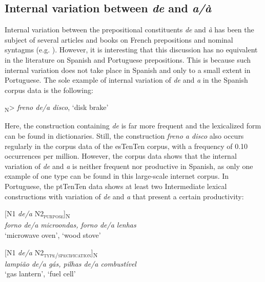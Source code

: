 \documentclass[output=paper]{langsci/langscibook}
\begin{document}
\subsection{Internal variation between \textit{de} and \textit{a/à}}

Internal variation between the prepositional constituents \textit{de} and \textit{à} has been the subject of several articles and books on French prepositions and nominal syntagms (e.g. \citealt{Anscombre:1990, Lang:1991, Bosredon:1991, Cadiot:1997}). However, it is interesting that this discussion has no equivalent in the literature on Spanish and Portuguese prepositions. This is because such internal variation does not take place in Spanish and only to a small extent in Portuguese. The sole example of internal variation of \textit{de} and \textit{a} in the Spanish corpus data is the following:

\ea{}\textsubscript{N}>		\textit{freno de/a disco},	`disk brake'\z

Here, the construction containing \textit{de} is far more frequent and the lexicalized form can be found in dictionaries. Still, the construction \textit{freno a disco} also occurs regularly in the corpus data of the esTenTen corpus, with a frequency of 0.10 occurrences per million. However, the corpus data shows that the internal variation of \textit{de} and \textit{a} is neither frequent nor productive in Spanish, as only one example of one type can be found in this large-scale internet corpus. In Portuguese, the ptTenTen data shows at least two Intermediate lexical constructions with variation of \textit{de} and \textit{a} that present a certain productivity:

\begin{exe}\ex\begin{minipage}[t]{0.4\textwidth}
[N1 \textit{de/a} N2\textsubscript{\scshape purpose}]\textsubscript{N}\\
\textit{forno de/a microondas,  forno de/a lenhas}\\
`microwave oven',         `wood stove'
\end{minipage}\hfill
\begin{minipage}[t]{0.45\textwidth}
[N1 \textit{de/a} N2\textsubscript{\scshape type/specification}]\textsubscript{N}\\
\textit{lampião de/a gás,   pilhas de/a combustível }\\
`gas lantern',           `fuel cell'
\end{minipage}%
\end{exe}
\end{document}

